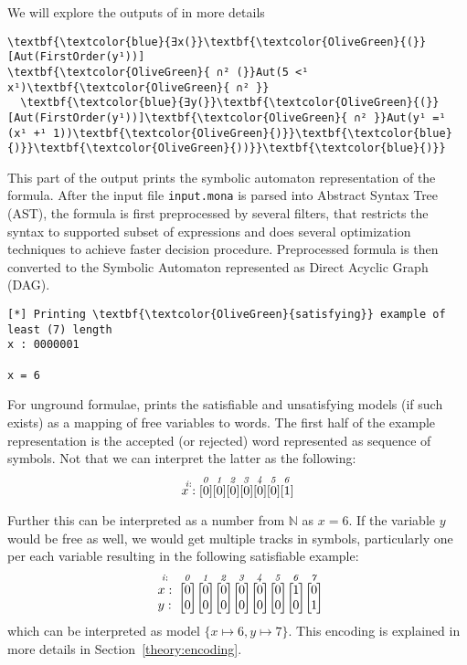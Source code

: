 We will explore the outputs of \gaston in more details

\begin{Verbatim}                               
\textbf{\textcolor{blue}{∃x(}}\textbf{\textcolor{OliveGreen}{(}}[Aut(FirstOrder(y¹))] 
\textbf{\textcolor{OliveGreen}{ ∩² (}}Aut(5 <¹ x¹)\textbf{\textcolor{OliveGreen}{ ∩² }}
  \textbf{\textcolor{blue}{∃y(}}\textbf{\textcolor{OliveGreen}{(}}[Aut(FirstOrder(y¹))]\textbf{\textcolor{OliveGreen}{ ∩² }}Aut(y¹ =¹ (x¹ +¹ 1))\textbf{\textcolor{OliveGreen}{)}}\textbf{\textcolor{blue}{)}}\textbf{\textcolor{OliveGreen}{))}}\textbf{\textcolor{blue}{)}}
\end{Verbatim}

This part of the output prints the symbolic automaton representation of the formula.
After the input file \texttt{input.mona} is parsed into Abstract Syntax Tree (AST),
the formula is first preprocessed by several filters, that restricts the syntax to
supported subset of expressions and does several optimization techniques to achieve
faster decision procedure. Preprocessed formula is then converted to the
Symbolic Automaton represented as Direct Acyclic Graph (DAG).

\begin{Verbatim}
[*] Printing \textbf{\textcolor{OliveGreen}{satisfying}} example of least (7) length
x : 0000001

x = 6
\end{Verbatim}

For unground formulae, \gaston prints the satisfiable and unsatisfying models 
(if such exists) as a mapping of free variables to words. The first half of the
example representation is the accepted (or rejected) word represented as sequence
of symbols. Not that we can interpret the latter as the following:
\begin{equation}
 \overset{\mathit{i:}}{x:} \unitracknolabwithindex{0}{0}\unitracknolabwithindex{0}{1}\unitracknolabwithindex{0}{2}\unitracknolabwithindex{0}{3}
 \unitracknolabwithindex{0}{4}\unitracknolabwithindex{0}{5}\unitracknolabwithindex{1}{6}
\end{equation}

Further this can be interpreted as a number from $\mathbb{N}$ as $x = 6$. If the variable
$y$ would be free as well, we would get multiple tracks in symbols, particularly one per
each variable resulting in the following satisfiable example:
\begin{equation}
 \overset{\mathit{i:}}{\bintracklab{x}{y}}\bintracknolabwithindex{0}{0}{0}\bintracknolabwithindex{0}{0}{1}\bintracknolabwithindex{0}{0}{2}\bintracknolabwithindex{0}{0}{3}\bintracknolabwithindex{0}{0}{4}\bintracknolabwithindex{0}{0}{5}
 \bintracknolabwithindex{1}{0}{6}\bintracknolabwithindex{0}{1}{7}
\end{equation}
which can be interpreted as model $\{x \mapsto 6, y \mapsto 7\}$. This encoding is explained
in more details in Section~\ref{theory:encoding}.

